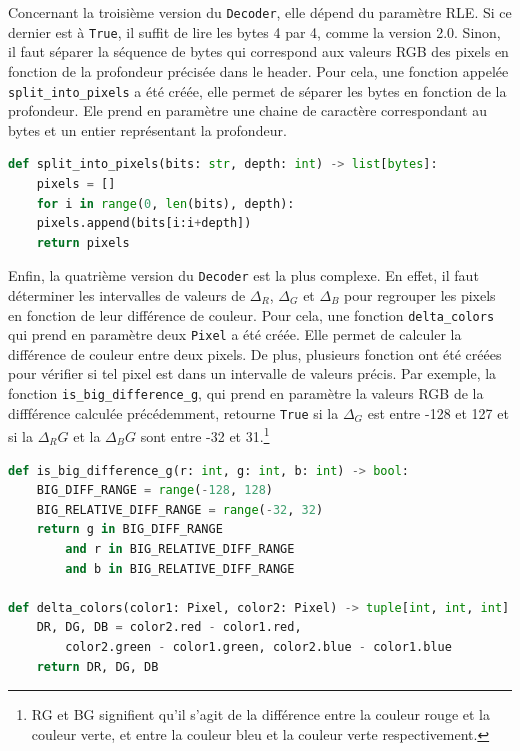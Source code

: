 \documentclass[utf8]{article}
\begin{document}
Concernant la troisième version du \texttt{Decoder}, elle dépend du paramètre RLE. Si ce dernier est à \texttt{True}, il suffit de lire les bytes 4 par 4, comme la version 2.0. Sinon, il faut séparer la séquence de bytes qui correspond aux valeurs RGB des pixels en fonction de la profondeur précisée dans le header. Pour cela, une fonction appelée \texttt{split_into_pixels} a été créée, elle permet de séparer les bytes en fonction de la profondeur. Ele prend en paramètre une chaine de caractère correspondant au bytes et un entier représentant la profondeur.

\begin{lstlisting}[language=Python, basicstyle=\small]
def split_into_pixels(bits: str, depth: int) -> list[bytes]:
    pixels = []
    for i in range(0, len(bits), depth):
	pixels.append(bits[i:i+depth])
    return pixels
\end{lstlisting}

Enfin, la quatrième version du \texttt{Decoder} est la plus complexe. En effet, il faut déterminer les intervalles de valeurs de $\Delta_R$, $\Delta_G$ et $\Delta_B$ pour regrouper les pixels en fonction de leur différence de couleur. Pour cela, une fonction \texttt{delta_colors} qui prend en paramètre deux \texttt{Pixel} a été créée. Elle permet de calculer la différence de couleur entre deux pixels. De plus, plusieurs fonction ont été créées pour vérifier si tel pixel est dans un intervalle de valeurs précis. Par exemple, la fonction \texttt{is_big_difference_g}, qui prend en paramètre la valeurs RGB de la diffférence calculée précédemment, retourne \texttt{True} si la $\Delta_G$ est entre -128 et 127 et si la $\Delta_RG$ et la $\Delta_BG$ sont entre -32 et 31.\footnote{RG et BG signifient qu'il s'agit de la différence entre la couleur rouge et la couleur verte, et entre la couleur bleu et la couleur verte respectivement.}

\begin{lstlisting}[language=Python, basicstyle=\small]
def is_big_difference_g(r: int, g: int, b: int) -> bool:
	BIG_DIFF_RANGE = range(-128, 128)
	BIG_RELATIVE_DIFF_RANGE = range(-32, 32)
	return g in BIG_DIFF_RANGE 
		and r in BIG_RELATIVE_DIFF_RANGE 
		and b in BIG_RELATIVE_DIFF_RANGE 

def delta_colors(color1: Pixel, color2: Pixel) -> tuple[int, int, int]:
	DR, DG, DB = color2.red - color1.red, 
		color2.green - color1.green, color2.blue - color1.blue
	return DR, DG, DB
\end{lstlisting}
\end{document}
